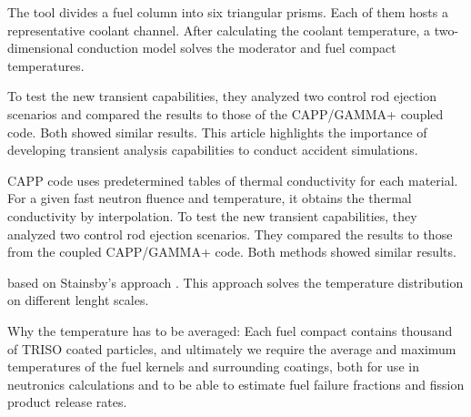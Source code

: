 The tool divides a fuel column into six triangular prisms.
Each of them hosts a representative coolant channel.
After calculating the coolant temperature, a two-dimensional conduction model solves the moderator and fuel compact temperatures.

To test the new transient capabilities, they analyzed two control rod ejection scenarios and compared the results to those of the CAPP/GAMMA+ coupled code.
Both showed similar results.
This article highlights the importance of developing transient analysis capabilities to conduct accident simulations.

CAPP code uses predetermined tables of thermal conductivity for each material.
For a given fast neutron fluence and temperature, it obtains the thermal conductivity by interpolation.
To test the new transient capabilities, they analyzed two control rod ejection scenarios.
They compared the results to those from the coupled CAPP/GAMMA+ code.
Both methods showed similar results.


based on Stainsby's approach \cite{stainsby_investigation_2008}.
This approach solves the temperature distribution on different lenght scales.


Why the temperature has to be averaged:
Each fuel compact contains thousand of TRISO coated particles, and ultimately we require the average and maximum temperatures of the fuel kernels and surrounding coatings, both for use in neutronics calculations and to be able to estimate fuel failure fractions and fission product release rates.